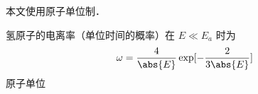 
本文使用原子单位制．

氢原子的电离率（单位时间的概率）在 $E \ll E_a$ 时为
\begin{equation}
\omega = \frac{4}{\abs{E}} \exp[-\frac{2}{3\abs{E}}]
\end{equation}
原子单位
